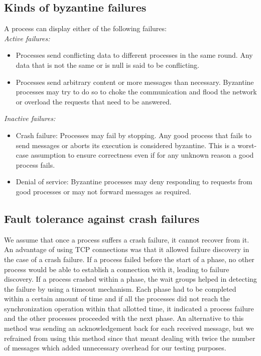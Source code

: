 \subsection{Kinds of byzantine failures} \label{sec:behavior} A process can
display either of the following failures: \\
\textit{Active failures:}
\begin{itemize} \item Processes send conflicting data to different processes in
            the same round. Any data that is not the same or is null is said to
            be conflicting.  \item Processes send arbitrary content or more
                messages than necessary. Byzantine processes may try to do so
                to choke the communication and flood the network or overload
                the requests that need to be answered.  \end{itemize}
            \textit{Inactive failures:} \begin{itemize} \item Crash failure:
                        Processes may fail by stopping. Any good process that
                        fails to send messages or aborts its execution is
                        considered byzantine. This is a worst-case assumption
                        to ensure correctness even if for any unknown reason
                        a good process fails.  \item Denial of service:
                            Byzantine processes may deny responding to requests
                            from good processes or may not forward messages as
                            required.  \end{itemize}

\subsection{Fault tolerance against crash failures} We assume that once
a process suffers a crash failure, it cannot recover from it. An advantage of
using TCP connections was that it allowed failure discovery in the case of
a crash failure. If a process failed before the start of a phase, no other
process would be able to establish a connection with it, leading to failure
discovery. If a process crashed within a phase, the wait groups helped in
detecting the failure by using a timeout mechanism. Each phase had to be
completed within a certain amount of time and if all the processes did not
reach the synchronization operation within that allotted time, it indicated
a process failure and the other processes proceeded with the next phase. 
An alternative to this method was sending an acknowledgement back for each
received message, but we refrained from using this method since that meant
dealing with twice the number of messages which added unnecessary overhead for
our testing purposes. 


